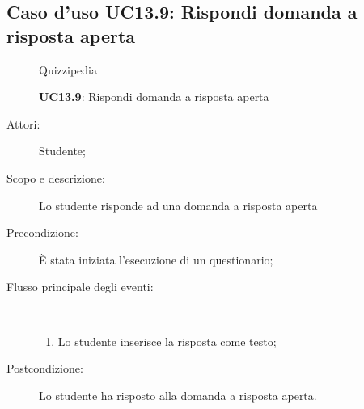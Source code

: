 \subsection{Caso d'uso UC13.9: Rispondi domanda a risposta aperta}
	\begin{figure}[H]
		\centering
		\begin{resizedtikzpicture}{\textwidth}
		\begin{umlsystem}[x=0, fill=lightgray!20]{Quizzipedia}
		\end{umlsystem}
		\end{resizedtikzpicture}
		\caption{\textbf{UC13.9}: Rispondi domanda a risposta aperta}
		\label{UC13.9}
	\end{figure}
\begin{description}
\item[Attori:] Studente;
\item[Scopo e descrizione:] Lo studente risponde ad una domanda a risposta aperta
      \item[Precondizione:] È stata iniziata l'esecuzione di un questionario;

        \item[Flusso principale degli eventi:] \ 
 \begin{enumerate}
          \item Lo studente inserisce la risposta come testo;

      \end{enumerate}
    \item[Postcondizione:] Lo studente ha risposto alla domanda a risposta aperta.
  \end{description}
\hypertarget{UC13.10}{}
